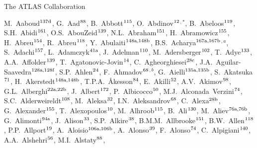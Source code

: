 \begin{flushleft}
{\Large The ATLAS Collaboration}

\bigskip

M.~Aaboud$^\textrm{\scriptsize 137d}$,
G.~Aad$^\textrm{\scriptsize 88}$,
B.~Abbott$^\textrm{\scriptsize 115}$,
O.~Abdinov$^\textrm{\scriptsize 12}$$^{,*}$,
B.~Abeloos$^\textrm{\scriptsize 119}$,
S.H.~Abidi$^\textrm{\scriptsize 161}$,
O.S.~AbouZeid$^\textrm{\scriptsize 139}$,
N.L.~Abraham$^\textrm{\scriptsize 151}$,
H.~Abramowicz$^\textrm{\scriptsize 155}$,
H.~Abreu$^\textrm{\scriptsize 154}$,
R.~Abreu$^\textrm{\scriptsize 118}$,
Y.~Abulaiti$^\textrm{\scriptsize 148a,148b}$,
B.S.~Acharya$^\textrm{\scriptsize 167a,167b}$$^{,a}$,
S.~Adachi$^\textrm{\scriptsize 157}$,
L.~Adamczyk$^\textrm{\scriptsize 41a}$,
J.~Adelman$^\textrm{\scriptsize 110}$,
M.~Adersberger$^\textrm{\scriptsize 102}$,
T.~Adye$^\textrm{\scriptsize 133}$,
A.A.~Affolder$^\textrm{\scriptsize 139}$,
T.~Agatonovic-Jovin$^\textrm{\scriptsize 14}$,
C.~Agheorghiesei$^\textrm{\scriptsize 28c}$,
J.A.~Aguilar-Saavedra$^\textrm{\scriptsize 128a,128f}$,
S.P.~Ahlen$^\textrm{\scriptsize 24}$,
F.~Ahmadov$^\textrm{\scriptsize 68}$$^{,b}$,
G.~Aielli$^\textrm{\scriptsize 135a,135b}$,
S.~Akatsuka$^\textrm{\scriptsize 71}$,
H.~Akerstedt$^\textrm{\scriptsize 148a,148b}$,
T.P.A.~{\AA}kesson$^\textrm{\scriptsize 84}$,
E.~Akilli$^\textrm{\scriptsize 52}$,
A.V.~Akimov$^\textrm{\scriptsize 98}$,
G.L.~Alberghi$^\textrm{\scriptsize 22a,22b}$,
J.~Albert$^\textrm{\scriptsize 172}$,
P.~Albicocco$^\textrm{\scriptsize 50}$,
M.J.~Alconada~Verzini$^\textrm{\scriptsize 74}$,
S.C.~Alderweireldt$^\textrm{\scriptsize 108}$,
M.~Aleksa$^\textrm{\scriptsize 32}$,
I.N.~Aleksandrov$^\textrm{\scriptsize 68}$,
C.~Alexa$^\textrm{\scriptsize 28b}$,
G.~Alexander$^\textrm{\scriptsize 155}$,
T.~Alexopoulos$^\textrm{\scriptsize 10}$,
M.~Alhroob$^\textrm{\scriptsize 115}$,
B.~Ali$^\textrm{\scriptsize 130}$,
M.~Aliev$^\textrm{\scriptsize 76a,76b}$,
G.~Alimonti$^\textrm{\scriptsize 94a}$,
J.~Alison$^\textrm{\scriptsize 33}$,
S.P.~Alkire$^\textrm{\scriptsize 38}$,
B.M.M.~Allbrooke$^\textrm{\scriptsize 151}$,
B.W.~Allen$^\textrm{\scriptsize 118}$,
P.P.~Allport$^\textrm{\scriptsize 19}$,
A.~Aloisio$^\textrm{\scriptsize 106a,106b}$,
A.~Alonso$^\textrm{\scriptsize 39}$,
F.~Alonso$^\textrm{\scriptsize 74}$,
C.~Alpigiani$^\textrm{\scriptsize 140}$,
A.A.~Alshehri$^\textrm{\scriptsize 56}$,
M.I.~Alstaty$^\textrm{\scriptsize 88}$,
$$
\end{flushleft}
